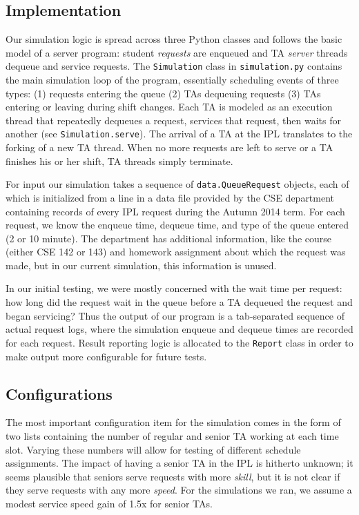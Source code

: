 \documentclass{article}
\begin{document}
\begin{multicols}{2}
\subsection*{Implementation}

Our simulation logic is spread across three Python classes and follows the basic model of a server program: student \textit{requests} are enqueued and TA \textit{server} threads dequeue and service requests. The \texttt{Simulation} class in \texttt{simulation.py} contains the main simulation loop of the program, essentially scheduling events of three types: (1) requests entering the queue (2) TAs dequeuing requests (3) TAs entering or leaving during shift changes. Each TA is modeled as an execution thread that repeatedly dequeues a request, services that request, then waits for another (see \texttt{Simulation.serve}). The arrival of a TA at the IPL translates to the forking of a new TA thread. When no more requests are left to serve or a TA finishes his or her shift, TA threads simply terminate.

For input our simulation takes a sequence of \texttt{data.QueueRequest} objects, each of which is initialized from a line in a data file provided by the CSE department containing records of every IPL request during the Autumn 2014 term. For each request, we know the enqueue time, dequeue time, and type of the queue entered (2 or 10 minute). The department has additional information, like the course (either CSE 142 or 143) and homework assignment about which the request was made, but in our current simulation, this information is unused.

In our initial testing, we were mostly concerned with the wait time per request: how long did the request wait in the queue before a TA dequeued the request and began servicing? Thus the output of our program is a tab-separated sequence of actual request logs, where the simulation enqueue and dequeue times are recorded for each request. Result reporting logic is allocated to the \texttt{Report} class in order to make output more configurable for future tests.

\subsection*{Configurations}

The most important configuration item for the simulation comes in the form of two lists containing the number of regular and senior TA working at each time slot. Varying these numbers will allow for testing of different schedule assignments. The impact of having a senior TA in the IPL is hitherto unknown; it seems plausible that seniors serve requests with more \textit{skill}, but it is not clear if they serve requests with any more \textit{speed}. For the simulations we ran, we assume a modest service speed gain of 1.5x for senior TAs.


\end{multicols}
\end{document}
